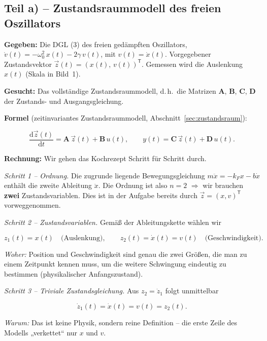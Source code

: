 \subsection*{Teil a) – Zustandsraummodell des freien Oszillators}

\begin{beispiel}

\textbf{Gegeben:} Die DGL (3) des freien gedämpften Oszillators,
$\dot{v}(t) = -\omega_0^2\, x(t) - 2\gamma\, v(t)$, mit $v(t) = \dot{x}(t)$.
Vorgegebener Zustandsvektor $\vec{z}(t) = (x(t),\, v(t))^{\mathsf{T}}$. Gemessen
wird die Auslenkung $x(t)$ (Skala in Bild~1).

\textbf{Gesucht:} Das vollständige Zustandsraummodell, d.\,h.\ die Matrizen
$\mathbf{A}$, $\mathbf{B}$, $\mathbf{C}$, $\mathbf{D}$ der Zustands- und
Ausgangsgleichung.

\textbf{Formel} (zeitinvariantes Zustandsraummodell,
Abschnitt~\ref{sec:zustandsraum}):

$$
\frac{\mathrm{d}\vec{z}(t)}{\mathrm{d}t} = \mathbf{A}\,\vec{z}(t) + \mathbf{B}\,u(t),
\qquad
y(t) = \mathbf{C}\,\vec{z}(t) + \mathbf{D}\,u(t).
$$

\textbf{Rechnung:} Wir gehen das Kochrezept Schritt für Schritt durch.

\medskip
\textit{Schritt 1 – Ordnung.}
Die zugrunde liegende Bewegungsgleichung $m\ddot{x} = -k_F x - b\dot{x}$ enthält
die zweite Ableitung $\ddot{x}$. Die Ordnung ist also $n = 2$
$\Rightarrow$ wir brauchen \textbf{zwei} Zustandsvariablen. Dies ist in der
Aufgabe bereits durch $\vec{z} = (x, v)^{\mathsf{T}}$ vorweggenommen.

\medskip
\textit{Schritt 2 – Zustandsvariablen.}
Gemäß der Ableitungskette wählen wir

$$
z_1(t) = x(t) \quad\text{(Auslenkung)}, \qquad
z_2(t) = \dot{x}(t) = v(t) \quad\text{(Geschwindigkeit)}.
$$

\emph{Woher:} Position und Geschwindigkeit sind genau die zwei Größen, die man
zu einem Zeitpunkt kennen muss, um die weitere Schwingung eindeutig zu bestimmen
(physikalischer Anfangszustand).

\medskip
\textit{Schritt 3 – Triviale Zustandsgleichung.}
Aus $z_2 = \dot{z}_1$ folgt unmittelbar

$$
\dot{z}_1(t) = \dot{x}(t) = v(t) = z_2(t).
$$

\emph{Warum:} Das ist keine Physik, sondern reine Definition -- die erste Zeile
des Modells „verkettet`` nur $x$ und $v$.


\end{beispiel}
